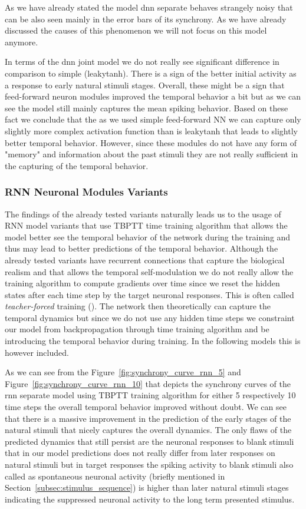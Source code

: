 As we have already stated the model dnn separate behaves strangely noisy that can be also seen mainly in the error bars of its synchrony. As we have already discussed the causes of this phenomenon we will not focus on this model anymore. 

In terms of the dnn joint model we do not really see significant difference in comparison to simple (leakytanh). There is a sign of the better initial activity as a response to early natural stimuli stages. Overall, these might be a sign that feed-forward neuron modules improved the temporal behavior a bit but as we can see the model still mainly captures the mean spiking behavior. Based on these fact we conclude that the as we used simple feed-forward NN we can capture only slightly more complex activation function than is leakytanh that leads to slightly better temporal behavior. However, since these modules do not have any form of "memory" and information about the past stimuli they are not really sufficient in the capturing of the temporal behavior. 

\subsubsection{RNN Neuronal Modules Variants}
\label{{subsubsec:rnn_eval}}
The findings of the already tested variants naturally leads us to the usage of RNN model variants that use TBPTT time training algorithm that allows the model better see the temporal behavior of the network during the training and thus may lead to better predictions of the temporal behavior. Although the already tested variants have recurrent connections that capture the biological realism and that allows the temporal self-modulation we do not really allow the training algorithm to compute gradients over time since we reset the hidden states after each time step by the target neuronal responses. This is often called \emph{teacher-forced} training (\citet{NIPS2016_16026d60}). The network then theoretically can capture the temporal dynamics but since we do not use any hidden time steps we constraint our model from backpropagation through time training algorithm and be introducing the temporal behavior during training. In the following models this is however included.

As we can see from the Figure~\ref{fig:synchrony_curve_rnn_5} and Figure~\ref{fig:synchrony_curve_rnn_10} that depicts the synchrony curves of the rnn separate model using TBPTT training algorithm for either 5 respectively 10 time steps the overall temporal behavior improved without doubt. We can see that there is a massive improvement in the prediction of the early stages of the natural stimuli that nicely captures the overall dynamics. The only flaws of the predicted dynamics that still persist are the neuronal responses to blank stimuli that in our model predictions does not really differ from later responses on natural stimuli but in target responses the spiking activity to blank stimuli also called as spontaneous neuronal activity (briefly mentioned in Section~\ref{subsec:stimulus_sequence}) is higher than later natural stimuli stages indicating the suppressed neuronal activity to the long term presented stimulus.

